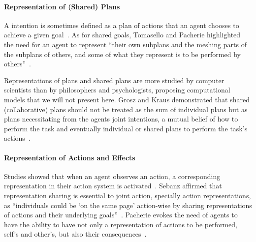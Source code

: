 \documentclass[a4paper,11pt,twoside]{StyleThese}
\begin{document}
\paragraph{Representation of (Shared) Plans}
A intention is sometimes defined as a plan of actions that an agent chooses to achieve a given goal~\cite{tomasello_2005_understanding, kaplan_2006_challenges}. 
As for shared goals, Tomasello \etal{} and Pacherie highlighted the need for an agent to represent ``their own subplans and the meshing parts of the subplans of others, and some of what they represent is to be performed by others''~\cite[p.~353]{pacherie_2012_agency}.

Representations of plans and shared plans are more studied by computer scientists than by philosophers and psychologists, proposing computational models that we will not present here. Grosz and Kraus demonstrated that shared (collaborative) plans should not be treated as the sum of individual plans but as plans necessitating from the agents joint intentions, a mutual belief of how to perform the task and eventually individual or shared plans to perform the task's actions~\cite{grosz_1996_collaborative}.

\paragraph{Representation of Actions and Effects}
Studies showed that when an agent observes an action, a corresponding representation in their action system is activated~\cite{rizzolatti_2004_mirror}. Sebanz \etal{} affirmed that representation sharing is essential to joint action, specially action representations, as ``individuals could be ‘on the same page’ action-wise by sharing representations of actions and their underlying goals''~\cite[p.~71]{sebanz_2006_joint}. Pacherie evokes the need of agents to have the ability to have not only a representation of actions to be performed, self's and other's, but also their consequences~\cite{pacherie_2012_agency}. 
\end{document}
